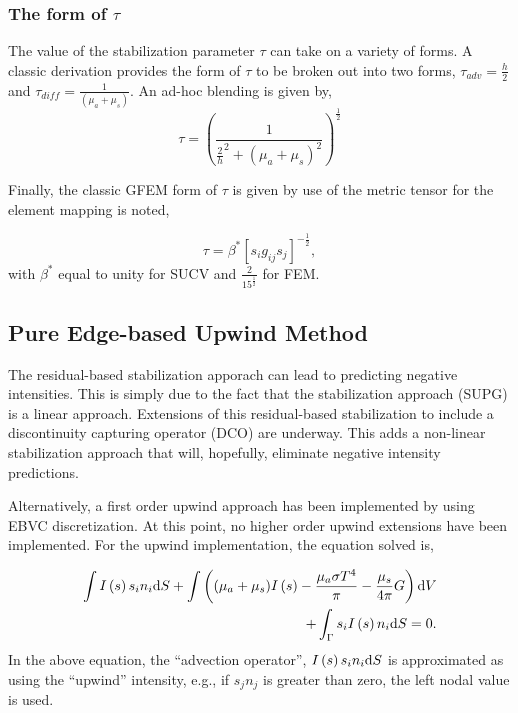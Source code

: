 \subsubsection{The form of $\tau$}
The value of the stabilization parameter $\tau$ can take on a variety of forms. 
A classic derivation provides the form of $\tau$ to be broken out into two forms, 
$\tau_{adv} = \frac{h}{2}$ and $\tau_{diff} = \frac{1}{(\mu_a+\mu_s)}$. An ad-hoc blending 
is given by,
\begin{equation}
   \tau  = \left( \frac{1} {\frac{2}{h}^2 + (\mu_a+\mu_s)^2} \right)^ \frac{1}{2}
\label{blendedTau}
\end{equation}

Finally, the classic GFEM form of $\tau$ is given by use of the metric tensor for the element mapping is noted,

\begin{equation}
   \tau = \beta^* [s_i g_{ij}s_j]^{-\frac{1}{2}},
\label{farzin}
\end{equation}
with $\beta^*$ equal to unity for SUCV and $\frac{2}{15^{\frac{1}{2}}}$ for FEM.

\subsection{Pure Edge-based Upwind Method}
The residual-based stabilization apporach can lead to predicting negative intensities. This is simply due 
to the fact that the stabilization approach (SUPG) is a linear approach. Extensions of this residual-based
stabilization to include a discontinuity capturing operator (DCO) are underway. This adds a non-linear stabilization
approach that will, hopefully, eliminate negative intensity predictions. 

Alternatively, a first order upwind approach has been implemented by using EBVC discretization. At this point, 
no higher order upwind extensions have been implemented. For the upwind implementation, the equation solved is,

\begin{eqnarray}
   \int I\left(s\right) s_i n_i {\rm d}S + \int \left( (\mu_a + \mu_s ) I\left(s\right) 
   - {{\mu_a \sigma T^4} \over {\pi}} -\frac{\mu_s}{4\pi}G \right) {\rm d}V  \nonumber \\
+ \int_\Gamma s_i I\left(s\right) n_i {\rm d}S  = 0.
\label{rteSUCVForm}
\end{eqnarray}
In the above equation, the ``advection operator'', $I\left(s\right) s_i n_i {\rm d}S$ is
approximated as using the ``upwind'' intensity, e.g., if $s_j n_j$ is greater than zero, 
the left nodal value is used.


